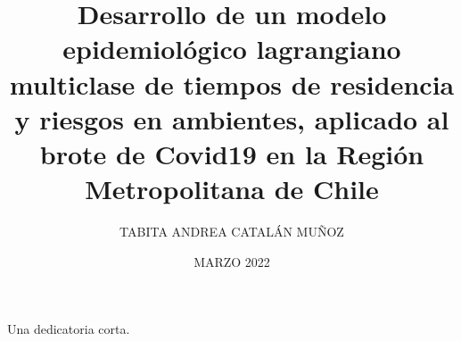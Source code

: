 \documentclass[upright, contnum]{umemoria}
\author{TABITA ANDREA CATALÁN MUÑOZ}
\title{Desarrollo de un modelo epidemiológico lagrangiano multiclase de tiempos de residencia y riesgos en ambientes, aplicado al brote de Covid19 en la Región Metropolitana de Chile}
\date{MARZO 2022}
\begin{document}
\frontmatter
\maketitle

\begin{abstract}
\lipsum[1-4]
\end{abstract}

\begin{dedicatoria}
Una dedicatoria corta.
\end{dedicatoria}

\begin{thanks}
\lipsum[1-2]
\end{thanks}

\cleardoublepage
\tableofcontents
\cleardoublepage
\listoftables
\cleardoublepage
\listoffigures

\mainmatter








\nocite{*}


\end{document}
